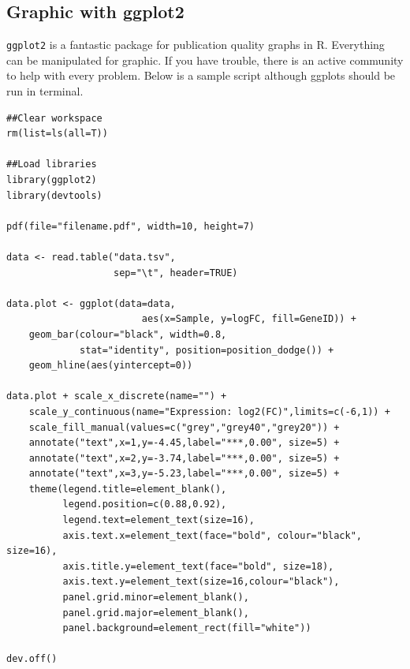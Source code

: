 \subsection{Graphic with ggplot2}
\texttt{ggplot2} is a fantastic package for publication quality graphs in R. Everything can be manipulated for graphic. If you have trouble, there is an active community to help with every problem. Below is a sample script although ggplots should be run in terminal.
\begin{verbatim}
##Clear workspace
rm(list=ls(all=T))

##Load libraries
library(ggplot2)
library(devtools)

pdf(file="filename.pdf", width=10, height=7)

data <- read.table("data.tsv",
                   sep="\t", header=TRUE)

data.plot <- ggplot(data=data,
                        aes(x=Sample, y=logFC, fill=GeneID)) +
    geom_bar(colour="black", width=0.8,
             stat="identity", position=position_dodge()) +
    geom_hline(aes(yintercept=0))

data.plot + scale_x_discrete(name="") +
    scale_y_continuous(name="Expression: log2(FC)",limits=c(-6,1)) + 
    scale_fill_manual(values=c("grey","grey40","grey20")) +
    annotate("text",x=1,y=-4.45,label="***,0.00", size=5) +
    annotate("text",x=2,y=-3.74,label="***,0.00", size=5) +
    annotate("text",x=3,y=-5.23,label="***,0.00", size=5) +
    theme(legend.title=element_blank(),
          legend.position=c(0.88,0.92),
          legend.text=element_text(size=16),
          axis.text.x=element_text(face="bold", colour="black", size=16),
          axis.title.y=element_text(face="bold", size=18),
          axis.text.y=element_text(size=16,colour="black"),
          panel.grid.minor=element_blank(),
          panel.grid.major=element_blank(),
          panel.background=element_rect(fill="white"))

dev.off()
\end{verbatim}
